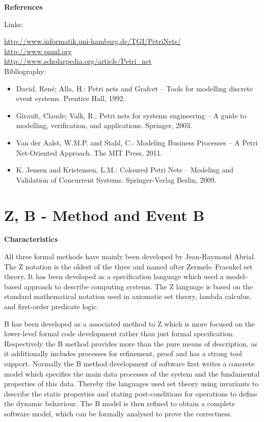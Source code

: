 \documentclass{./template/openetcs_report}
\begin{document}
	\textbf{References}

Links:

\url{http://www.informatik.uni-hamburg.de/TGI/PetriNets/}\\[4pt]
\url{http://www.pnml.org}\\[4pt]
\url{http://www.scholarpedia.org/article/Petri_net} \\[4pt]

Bibliography:
\begin{itemize}
\item David, René; Alla, H.: Petri nets and Grafcet -- Tools for modelling discrete event systems. Prentice Hall, 1992.
\item Girault, Claude; Valk, R.: Petri nets for systems engineering -- A guide to modelling, verification, and applications. Springer, 2003.
\item Van der Aalst, W.M.P. and Stahl, C.: Modeling Business Processes -- A Petri Net-Oriented Approach. The MIT Press, 2011.
\item K. Jensen and Kristensen, L.M.: Coloured Petri Nets -- Modeling and Validation of Concurrent Systems. Springer-Verlag Berlin, 2009.
\end{itemize}



\section{Z, B - Method and Event B}


	\textbf{Characteristics}

All three formal methods have mainly been developed by Jean-Raymond Abrial. The Z notation is the oldest of the three  and named after Zermelo–Fraenkel set theory. It has been developed as a specification language which used a model-based approach to describe computing systems. The Z language is based on the standard mathematical notation used in axiomatic set theory, lambda calculus, and first-order predicate logic. 

 B has been developed as a associated method to Z which is more focused on the lower-level formal code development rather than just formal specification. Respectively the B method provides more than the pure means of description, as it additionally includes processes for refinement, proof and has a strong tool support. Normally the B method development of software first writes a concrete model which specifies the main data processes of the system and the fundamental properties of this data. Thereby the languages used set theory using invariants to describe the static properties and stating post-conditions for operations to define the dynamic behaviour. The B model is then refined to obtain a complete software model, which can be formally analysed to prove the correctness.
 
\end{document}
